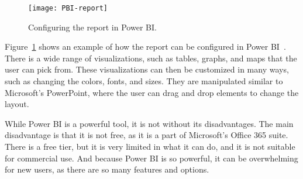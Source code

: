 \begin{figure}[H]
    \centering
    \texttt{[image: PBI-report]}
    \caption{Configuring the report in Power BI.\@
    }\label{fig:PBI-report}
\end{figure}

Figure~\ref{fig:PBI-report} shows an example of how the report can be configured in Power BI~\cite{power-bi}.
There is a wide range of visualizations, such as tables, graphs, and maps that the user can pick from.
These visualizations can then be customized in many ways, such as changing the colors, fonts, and sizes.
They are manipulated similar to Microsoft's PowerPoint, where the user can drag and drop elements to change the layout.

While Power BI is a powerful tool, it is not without its disadvantages.
The main disadvantage is that it is not free, as it is a part of Microsoft's Office 365 suite.
There is a free tier, but it is very limited in what it can do, and it is not suitable for commercial use.
And because Power BI is so powerful, it can be overwhelming for new users, as there are so many features and options.
